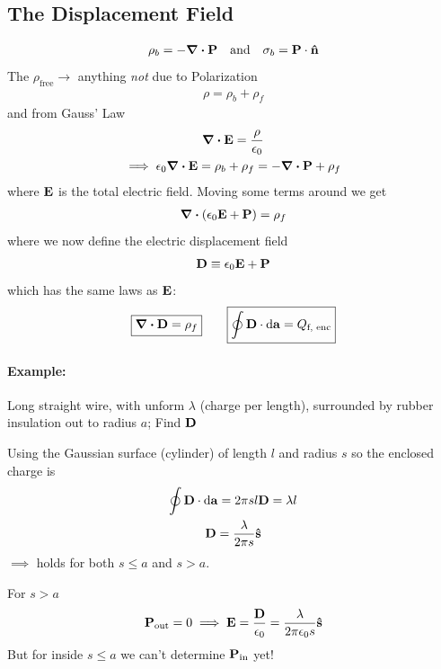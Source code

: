 \documentclass[../main.tex]{subfiles}
\begin{document}
\subsection{The Displacement Field}
\begin{align*}
    \rho_b = -\div \vb P \qand \sigma_b = \vb P \cdot \vu n
\end{align*}
The $\rho_\text{free} \to$ anything \textit{not} due to Polarization
\begin{align*}
    \rho = \rho_b + \rho_f
\end{align*} 
and from Gauss' Law
\begin{gather*}
    \div \vb E = \frac{\rho}{\epsilon_0} \\
    \implies \epsilon_0 \div \vb E = \rho_b + \rho_f = - \div \vb P + \rho_f
\end{gather*}
where $\vb E$ is the total electric field. Moving some terms around we get
\begin{align*}
    \div \qt(\epsilon_0 \vb E + \vb P) = \rho_f
\end{align*}
where we now define the electric displacement field
\begin{align*}
    \vb D \equiv \epsilon_0 \vb E + \vb P
\end{align*}
which has the same laws as $\vb E$:
\begin{align*}
    \boxed{\div \vb D = \rho_f} \qquad \boxed{\oint \vb D \cdot \dd\vb a = Q_\text{f, enc}}
\end{align*}

\paragraph{Example:} Long straight wire, with unform $\lambda$ (charge per length),
surrounded by rubber insulation out to radius $a$; Find $\vb D$

Using the Gaussian surface (cylinder) of length $l$ and radius $s$ so the enclosed charge is
\begin{gather*}
    \oint \vb D \cdot \dd\vb a = 2\pi s l \vb D = \lambda l \\
    \vb D = \frac{\lambda}{2\pi s} \vu s
\end{gather*}
$\implies$ holds for both $s \leq a$ and $s > a$. 

For $s > a$
\begin{align*}
    \vb P_\text{out} = 0 \implies \vb E = \frac{\vb D}{\epsilon_0} = \frac{\lambda}{2\pi \epsilon_0 s} \vu s
\end{align*}
But for inside $s \leq a$ we can't determine $\vb P_\text{in}$ yet!
\end{document}
